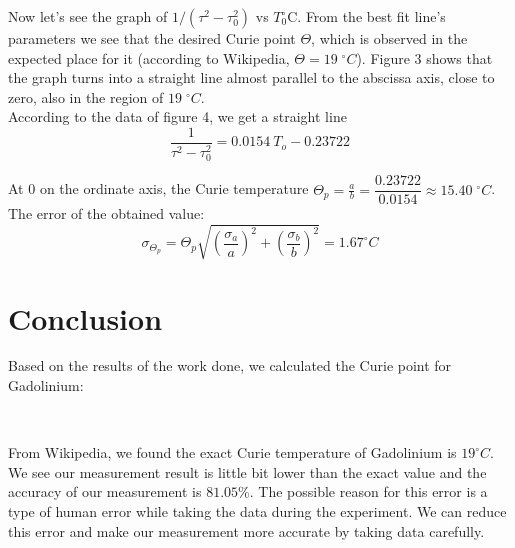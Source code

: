 \documentclass[a4paper, 12pt]{article}%
\begin{document}
\newpage
Now let's see the graph of $1 / (\tau^2 - \tau_0^2)$ vs $T_0^{\circ} \mathrm{C}$. From the best fit line's parameters we see that the desired Curie point $\Theta$, which is observed in the expected place for it (according to Wikipedia, $ \Theta = 19 \; ^\circ C$). Figure 3 shows that the graph turns into a straight line almost parallel to the abscissa axis, close to zero, also in the region of $19\; ^\circ C$.\\
\newline
According to the data of figure 4, we get a straight line
\begin{equation}
 \dfrac{1}{ \tau^2 - \tau_0^2} = 0.0154 \ T_o - 0.23722
\end{equation}

At 0 on the ordinate axis, the Curie temperature $ \Theta_p = \frac{a}{b} = \dfrac{0.23722}{0.0154} \approx 15.40 \; ^\circ C$. The error of the obtained value:
\begin{equation}
\sigma_{\Theta_p} = \Theta_p \sqrt{(\dfrac{\sigma_a}{a})^2 + (\dfrac{\sigma_b}{b})^2} = 1.67 ^\circ C
\end{equation}
\section{Conclusion}
Based on the results of the work done, we calculated the Curie point for Gadolinium:
\begin{center}
	{} \\
\end{center} 
From Wikipedia, we found the exact Curie temperature of Gadolinium is $19^\circ C$. We see our measurement result is little bit lower than the exact value and the accuracy of our measurement is $81.05\%$. The possible reason for this error is a type of human error while taking the data during the experiment. We can reduce this error and make our measurement more accurate by taking data carefully.
\end{document}
